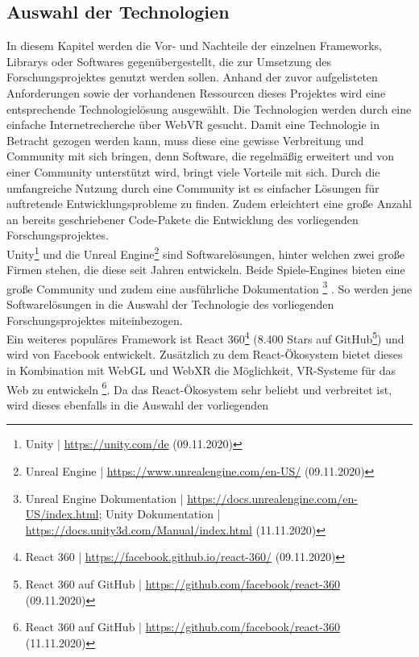 \documentclass[a4paper,12pt,oneside]{article}
\begin{document}
    \subsection{Auswahl der Technologien}
      In diesem Kapitel werden die Vor- und Nachteile der einzelnen Frameworks, Librarys
      oder Softwares gegenübergestellt, die zur Umsetzung des Forschungsprojektes genutzt
      werden sollen. Anhand der zuvor aufgelisteten Anforderungen sowie der vorhandenen
      Ressourcen dieses Projektes wird eine entsprechende Technologielösung 
      ausgewählt.
      Die Technologien werden durch eine einfache Internetrecherche über WebVR gesucht.
      Damit eine Technologie in Betracht gezogen werden kann, muss diese eine gewisse
      Verbreitung und Community mit sich bringen, denn Software, die regelmäßig erweitert
      und von einer Community unterstützt wird, bringt viele Vorteile mit sich. 
      Durch die umfangreiche Nutzung durch eine Community ist es einfacher Lösungen
      für auftretende Entwicklungsprobleme zu finden. Zudem erleichtert eine große
      Anzahl an bereits geschriebener Code-Pakete die Entwicklung des vorliegenden 
      Forschungsprojektes. \\
      Unity\footnote{Unity | \url{https://unity.com/de} (09.11.2020)} und die 
      Unreal Engine\footnote{Unreal Engine | \url{https://www.unrealengine.com/en-US/} (09.11.2020)} 
      sind Softwarelösungen, hinter welchen zwei große
      Firmen stehen, die diese seit Jahren entwickeln. Beide Spiele-Engines bieten eine
      große Community und zudem eine ausführliche Dokumentation
      \footnote{Unreal Engine Dokumentation | \url{https://docs.unrealengine.com/en-US/index.html}; Unity Dokumentation | \url{https://docs.unity3d.com/Manual/index.html} (11.11.2020)}
      .
      So werden jene Softwarelösungen in die Auswahl der Technologie des vorliegenden
      Forschungsprojektes miteinbezogen. \\
      Ein weiteres populäres Framework ist React 360\footnote{React 360 | \url{https://facebook.github.io/react-360/} (09.11.2020)}
      (8.400 Stars auf GitHub\footnote{React 360 auf GitHub | \url{https://github.com/facebook/react-360} (09.11.2020)})
      und wird von Facebook entwickelt. 
      Zusätzlich zu dem React-Ökosystem bietet dieses in Kombination mit WebGL und WebXR
      die Möglichkeit, VR-Systeme für das Web zu entwickeln
      \footnote{React 360 auf GitHub | \url{https://github.com/facebook/react-360} (11.11.2020)}.      
      Da das React-Ökosystem sehr beliebt und verbreitet
      ist, wird dieses ebenfalls in die Auswahl der vorliegenden 
\end{document}
